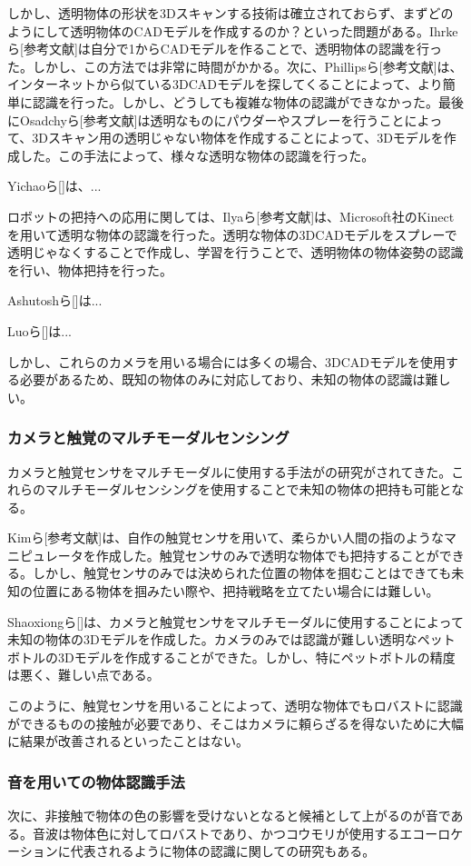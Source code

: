 しかし、透明物体の形状を3Dスキャンする技術は確立されておらず、まずどのようにして透明物体のCADモデルを作成するのか？といった問題がある。Ihrkeら[参考文献]は自分で1からCADモデルを作ることで、透明物体の認識を行った。しかし、この方法では非常に時間がかかる。次に、Phillipsら[参考文献]は、インターネットから似ている3DCADモデルを探してくることによって、より簡単に認識を行った。しかし、どうしても複雑な物体の認識ができなかった。最後にOsadchyら[参考文献]は透明なものにパウダーやスプレーを行うことによって、3Dスキャン用の透明じゃない物体を作成することによって、3Dモデルを作成した。この手法によって、様々な透明な物体の認識を行った。

Yichaoら[]は、...
\fi

ロボットの把持への応用に関しては、Ilyaら[参考文献]は、Microsoft社のKinectを用いて透明な物体の認識を行った。透明な物体の3DCADモデルをスプレーで透明じゃなくすることで作成し、学習を行うことで、透明物体の物体姿勢の認識を行い、物体把持を行った。

Ashutoshら[]は...

Luoら[]は...
\fi

しかし、これらのカメラを用いる場合には多くの場合、3DCADモデルを使用する必要があるため、既知の物体のみに対応しており、未知の物体の認識は難しい。

\subsubsection{カメラと触覚のマルチモーダルセンシング}
\label{sec:visual-based_pouring_motion}
カメラと触覚センサをマルチモーダルに使用する手法がの研究がされてきた。これらのマルチモーダルセンシングを使用することで未知の物体の把持も可能となる。

Kimら[参考文献]は、自作の触覚センサを用いて、柔らかい人間の指のようなマニピュレータを作成した。触覚センサのみで透明な物体でも把持することができる。しかし、触覚センサのみでは決められた位置の物体を掴むことはできても未知の位置にある物体を掴みたい際や、把持戦略を立てたい場合には難しい。

Shaoxiongら[]は、カメラと触覚センサをマルチモーダルに使用することによって未知の物体の3Dモデルを作成した。カメラのみでは認識が難しい透明なペットボトルの3Dモデルを作成することができた。しかし、特にペットボトルの精度は悪く、難しい点である。

このように、触覚センサを用いることによって、透明な物体でもロバストに認識ができるものの接触が必要であり、そこはカメラに頼らざるを得ないために大幅に結果が改善されるといったことはない。

\subsubsection{音を用いての物体認識手法}
\label{sec:tactile-based_manipulation}
次に、非接触で物体の色の影響を受けないとなると候補として上がるのが音である。音波は物体色に対してロバストであり、かつコウモリが使用するエコーロケーションに代表されるように物体の認識に関しての研究もある。

